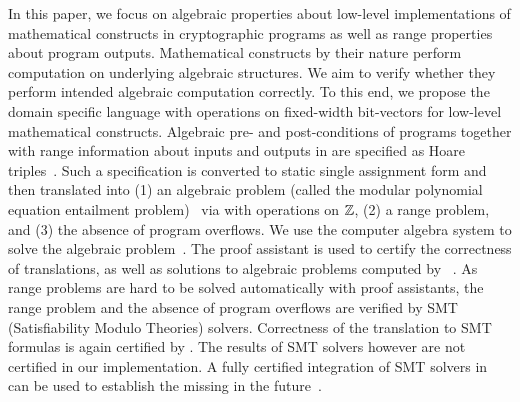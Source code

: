 In this paper, we focus on algebraic properties about low-level
implementations of mathematical constructs in cryptographic programs
as well as range properties about program outputs.
Mathematical constructs by their nature perform computation on
underlying algebraic structures. We aim to verify whether they perform
intended algebraic computation correctly. To this end, we propose the
domain specific language \bvdsl with operations on fixed-width bit-vectors for low-level
mathematical constructs. Algebraic pre- and post-conditions of
programs together with range information about inputs and outputs in \bvdsl are specified as Hoare
triples~\cite{H:69:ABCP}.
Such a specification is converted to static single
assignment form and then translated into (1) an algebraic problem (called
the modular polynomial equation entailment
problem)~\cite{AWZ:88:DQVP,H:07:AENTP} via \zdsl with operations on $\mathbb{Z}$, (2) a range problem, and (3) the absence of program overflows. We use the computer
algebra system \singular to solve the algebraic problem~\cite{GP:08:SICA}.
The proof assistant \coq is used to certify the
correctness of translations, as well as solutions to algebraic
problems computed by \singular~\cite{YC:2004:ITPPDC}.
As range problems are hard to be solved automatically with proof assistants, the range problem and the absence of program overflows are verified by SMT (Satisfiability Modulo Theories) solvers. 
Correctness of the translation to SMT formulas is again certified by
\coq. The results of SMT solvers however are not certified in our
implementation. A fully certified integration of SMT solvers in \coq
can be used to establish the missing in the future~\cite{EMT+:17:SPISS}.


